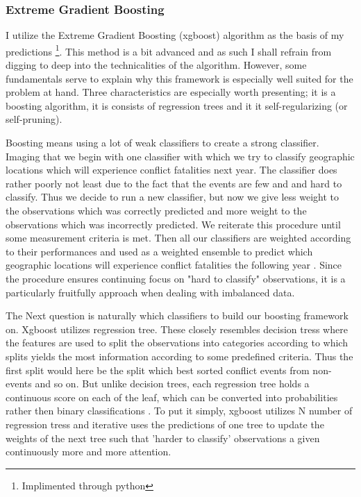 \documentclass[a4paper]{article}
\begin{document}
\subsubsection{Extreme Gradient Boosting}

I utilize the Extreme Gradient Boosting (xgboost) algorithm as the basis of my predictions \citep{Chen_2016}\footnote{Implimented through python}. This method is a bit advanced and as such I shall refrain from digging to deep into the technicalities of the algorithm. However, some fundamentals serve to explain why this framework is especially well suited for the problem at hand. Three characteristics are especially worth presenting; it is a boosting algorithm, it is consists of regression trees and it it self-regularizing (or self-pruning).

Boosting means using a lot of weak classifiers to create a strong classifier. Imaging that we begin with one classifier with which we try to classify geographic locations which will experience conflict fatalities next year. The classifier does rather poorly not least due to the fact that the events are few and and hard to classify. Thus we decide to run a new classifier, but now we give less weight to the observations which was correctly predicted and more weight to the observations which was incorrectly predicted. We reiterate this procedure until some measurement criteria is met. Then all our classifiers are weighted according to their performances and used as a weighted ensemble to predict which geographic locations will experience conflict fatalities the following year \citep[338-339]{Friedman_2001}. Since the procedure ensures continuing focus on "hard to classify" observations, it is a particularly fruitfully approach when dealing with imbalanced data.\par

The Next question is naturally which classifiers to build our boosting framework on. Xgboost utilizes regression tree. These closely resembles decision tress where the features are used to split the observations into categories according to which splits yields the most information according to some predefined criteria. Thus the first split would here be the split which best sorted conflict events from non-events and so on. But unlike decision trees, each regression tree holds a continuous score on each of the leaf, which can be converted into probabilities rather then binary classifications \citep[2]{Chen_2016}. To put it simply, xgboost utilizes N number of regression tress and iterative uses the predictions of one tree to update the weights of the next tree such that 'harder to classify' observations a given continuously more and more attention.\par
\end{document}
